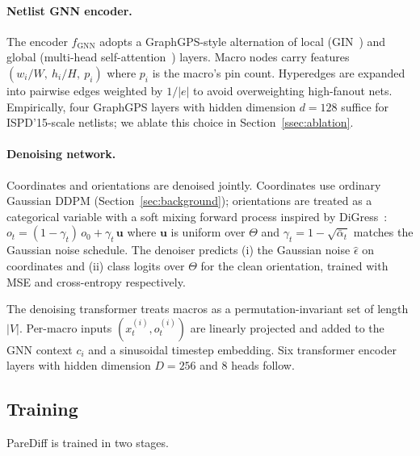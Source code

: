 \paragraph{Netlist GNN encoder.}
The encoder $f_\textrm{GNN}$ adopts a GraphGPS-style alternation of local (GIN~\cite{xu2018gin}) and global (multi-head self-attention~\cite{vaswani2017attention}) layers. Macro nodes carry features $(w_i / W,\ h_i / H,\ p_i)$ where $p_i$ is the macro's pin count. Hyperedges are expanded into pairwise edges weighted by $1/|e|$ to avoid overweighting high-fanout nets. Empirically, four GraphGPS layers with hidden dimension $d=128$ suffice for ISPD'15-scale netlists; we ablate this choice in Section~\ref{ssec:ablation}.

\paragraph{Denoising network.}
Coordinates and orientations are denoised jointly. Coordinates use ordinary Gaussian DDPM (Section~\ref{sec:background}); orientations are treated as a categorical variable with a soft mixing forward process inspired by DiGress~\cite{vignac2023digress}: $o_t = (1-\gamma_t)\, o_0 + \gamma_t\, \mathbf{u}$ where $\mathbf{u}$ is uniform over $\Theta$ and $\gamma_t = 1 - \sqrt{\bar{\alpha}_t}$ matches the Gaussian noise schedule. The denoiser predicts (i) the Gaussian noise $\hat\epsilon$ on coordinates and (ii) class logits over $\Theta$ for the clean orientation, trained with MSE and cross-entropy respectively.

The denoising transformer treats macros as a permutation-invariant set of length $|V|$. Per-macro inputs $(x_t^{(i)}, o_t^{(i)})$ are linearly projected and added to the GNN context $c_i$ and a sinusoidal timestep embedding. Six transformer encoder layers with hidden dimension $D=256$ and 8 heads follow.

\subsection{Training}
\label{ssec:training}

PareDiff is trained in two stages.

